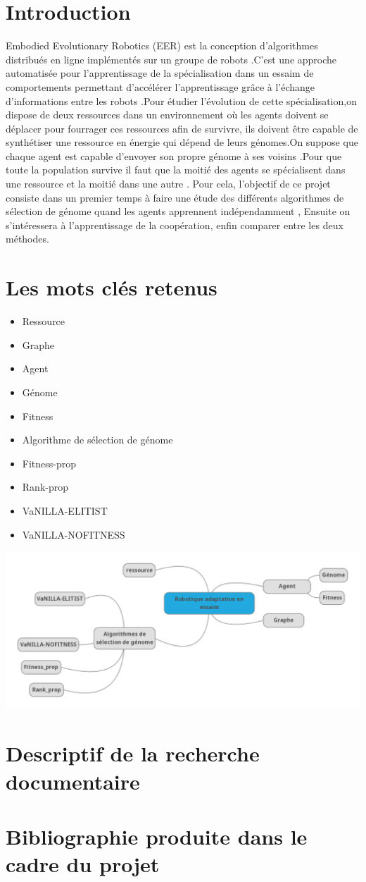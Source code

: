 \documentclass[11pt]{article}
\begin{document}
\begin{flushleft}
\section{Introduction}
 Embodied Evolutionary Robotics (EER) est la conception d’algorithmes distribués en ligne implémentés  sur un groupe de robots .C’est une approche automatisée pour l’apprentissage de la spécialisation dans un essaim de comportements permettant d'accélérer l’apprentissage grâce à l’échange d’informations entre les robots  .Pour étudier l'évolution  de cette spécialisation,on dispose de deux ressources dans un environnement où les agents doivent se déplacer pour fourrager ces ressources afin de survivre, ils doivent être capable de synthétiser une  ressource en énergie qui dépend de  leurs génomes.On suppose que chaque agent est capable d’envoyer son propre génome à ses voisins .Pour que  toute la population survive il faut  que la moitié des agents se spécialisent dans une ressource et la moitié dans une autre .
   Pour cela, l’objectif de ce projet consiste dans un premier temps à faire une étude des différents algorithmes de sélection de génome quand les agents apprennent indépendamment , Ensuite on s'intéressera  à l'apprentissage de la coopération, enfin comparer entre les deux méthodes.

\section{Les mots clés retenus}

 \begin{itemize} \item Ressource   \item Graphe  \item Agent\item Génome \item Fitness   \item Algorithme de sélection de génome  \item Fitness-prop \item Rank-prop  \item VaNILLA-ELITIST  \item VaNILLA-NOFITNESS 
  \end{itemize} 
\includegraphics[scale=0.4]{carte.png} 

\section{Descriptif de la recherche documentaire}


\section{Bibliographie produite dans le cadre du projet}
\end{flushleft}
\end{document}
